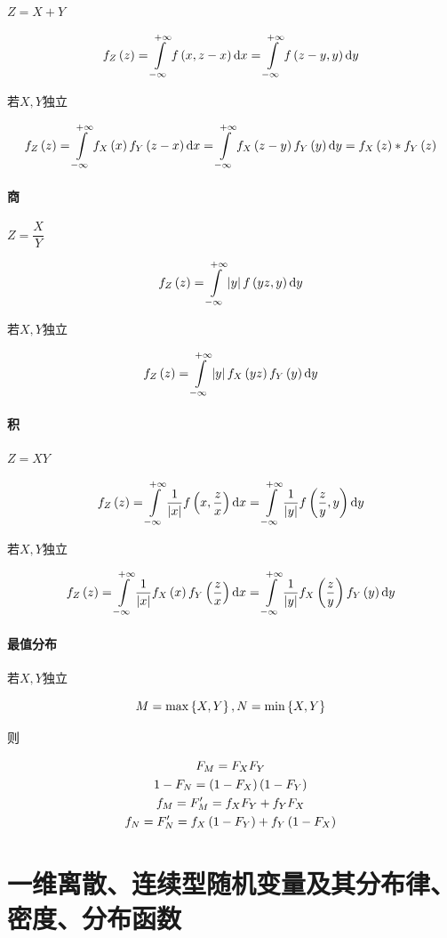 \documentclass{article}
\begin{document}
$Z=X+Y$

\[f_Z\p{z}
    =\impint f\p{x,z-x}\d x
    =\impint f\p{z-y,y}\d y\]

若$X,Y$独立

\[f_Z\p{z}
    =\impint f_X\p{x}f_Y\p{z-x}\d x
    =\impint f_X\p{z-y}f_Y\p{y}\d y
    =f_X\p{z}*f_Y\p{z}\]

\paragraph{商}

$Z=\dfrac XY$

\[f_Z\p{z}
    =\impint\abs yf\p{yz,y}\d y\]

若$X,Y$独立

\[f_Z\p{z}
    =\impint\abs yf_X\p{yz}f_Y\p{y}\d y\]

\paragraph{积}

$Z=XY$

\[f_Z\p{z}
    =\impint\frac1{\abs x}f\p{x,\frac zx}\d x
    =\impint\frac1{\abs y}f\p{\frac zy,y}\d y\]

若$X,Y$独立

\[f_Z\p{z}
    =\impint\frac1{\abs x}f_X\p{x}f_Y\p{\frac zx}\d x
    =\impint\frac1{\abs y}f_X\p{\frac zy}f_Y\p{y}\d y\]

\paragraph{最值分布}

若$X,Y$独立

\[M=\max\B{X,Y},N=\min\B{X,Y}\]

则

\[\begin{gathered}
        F_M=F_XF_Y\\
        1-F_N=\p{1-F_X}\p{1-F_Y}\\
        f_M=F^\prime_M=f_XF_Y+f_YF_X\\
        f_N=F^\prime_N=f_X\p{1-F_Y}+f_Y\p{1-F_X}
    \end{gathered}\]


\section{一维离散、连续型随机变量及其分布律、密度、分布函数}
\end{document}
